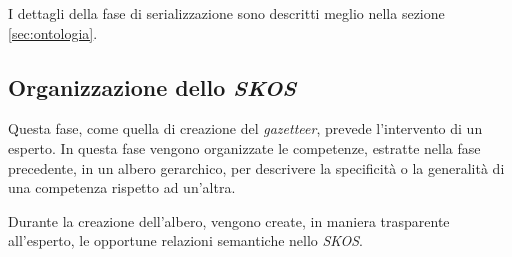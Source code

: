\documentclass[tesi.tex]{subfiles}
\begin{document}
I dettagli della fase di serializzazione sono descritti meglio nella
sezione \ref{sec:ontologia}.

\subsection{Organizzazione dello \emph{SKOS}}
Questa fase, come quella di creazione del \emph{gazetteer}, prevede
l'intervento di un esperto. In questa fase vengono organizzate le
competenze, estratte nella fase precedente, in un albero gerarchico,
per descrivere la specificit\`a o la generalit\`a di una competenza
rispetto ad un'altra.

Durante la creazione dell'albero, vengono create, in maniera
trasparente all'esperto, le opportune relazioni semantiche nello \emph{SKOS}.
\end{document}
